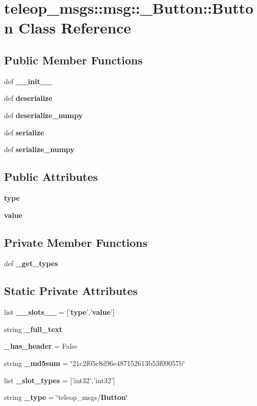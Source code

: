 \section{teleop\_\-msgs::msg::\_\-Button::Button Class Reference}
\label{classteleop__msgs_1_1msg_1_1__Button_1_1Button}
\subsection*{Public Member Functions}
\begin{DoxyCompactItemize}
\item 
def {\bf \_\-\_\-init\_\-\_\-}
\item 
def {\bf deserialize}
\item 
def {\bf deserialize\_\-numpy}
\item 
def {\bf serialize}
\item 
def {\bf serialize\_\-numpy}
\end{DoxyCompactItemize}
\subsection*{Public Attributes}
\begin{DoxyCompactItemize}
\item 
{\bf type}
\item 
{\bf value}
\end{DoxyCompactItemize}
\subsection*{Private Member Functions}
\begin{DoxyCompactItemize}
\item 
def {\bf \_\-get\_\-types}
\end{DoxyCompactItemize}
\subsection*{Static Private Attributes}
\begin{DoxyCompactItemize}
\item 
list {\bf \_\-\_\-slots\_\-\_\-} = ['{\bf type}','{\bf value}']
\item 
string {\bf \_\-full\_\-text}
\item 
{\bf \_\-has\_\-header} = False
\item 
string {\bf \_\-md5sum} = \char`\"{}21c2f05c8d96e487152613b53f09057b\char`\"{}
\item 
list {\bf \_\-slot\_\-types} = ['int32','int32']
\item 
string {\bf \_\-type} = \char`\"{}teleop\_\-msgs/{\bf Button}\char`\"{}
\end{DoxyCompactItemize}


